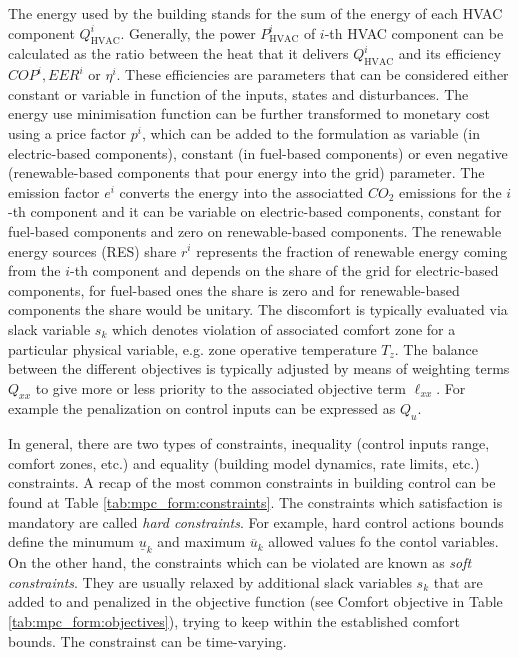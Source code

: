 \documentclass[10pt]{extarticle}
\begin{document}
The energy used by the building stands for the sum of the energy of each
HVAC component $Q^i_{\text{HVAC}}$.
Generally, the power $P^i_{\text{HVAC}}$ of $i$-th HVAC component can be calculated as the
ratio between the heat that it delivers $Q^i_{\text{HVAC}}$ and its efficiency $COP^i, EER^i$ or $\eta^i$. 
These efficiencies are parameters that can be considered either constant or variable
in function of the inputs, states and disturbances.
The energy use
minimisation function can be further transformed to monetary cost  using a price factor  $p^i$, which can be added to the formulation 
as variable (in electric-based components), constant (in fuel-based components) or even negative 
(renewable-based components that pour energy into the grid) parameter.
The emission factor $e^i$ converts the energy into the associatted $CO_2$ emissions 
for the $i$-th component  and it can be variable on electric-based components,
constant for fuel-based components and zero on renewable-based components.
The renewable energy sources (RES) share $r^i$ represents the fraction of renewable
energy coming from the  $i$-th component and depends on the share of the grid for
electric-based components, for fuel-based ones the share is zero and for
renewable-based components the share would be unitary.
The discomfort is typically evaluated via slack variable $s_k$ which denotes violation of associated comfort  zone for a particular physical variable, e.g. zone operative temperature $T_z$.
The balance between the different objectives is typically adjusted
by means of weighting terms $Q_{xx}$ to give more or less priority to the associated objective term $\ell_{xx}$.
For example the penalization on control inputs can be expressed as $Q_{u}$.

In general, there are two types of constraints,
inequality  (control inputs range, comfort zones, etc.) and equality 
(building model dynamics, rate limits, etc.) constraints.
A recap of the most common constraints in building control can be found at
Table \ref{tab:mpc_form:constraints}.
The constraints which satisfaction is mandatory are called 
\textit{hard constraints}. For example, hard control actions
bounds define the minumum $\underline{u}_k$ and maximum $\overline{u}_k$ allowed values fo the contol variables.
 On the other hand, the constraints which can 
be violated are known as \textit{soft constraints}. They are usually relaxed
by additional slack variables $s_k$ that are added to and
penalized in the objective function (see Comfort objective in Table
\ref{tab:mpc_form:objectives}), trying to keep within the established
comfort bounds. The constrainst can be time-varying.
\end{document}

